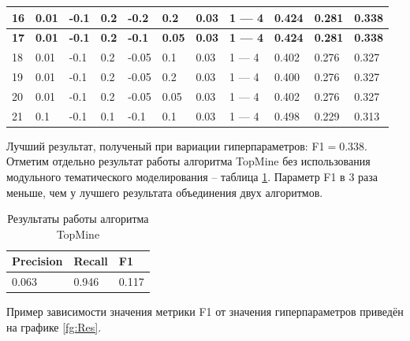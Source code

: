 \documentclass[a4paper, 12pt]{article}
\begin{document}
\begin{table}[!ht]
\begin{tabular}{|l|l|l|l|l|l|l|p{50 pt}|l|l|l|}
        \textbf{16} & \textbf{0.01} & \textbf{-0.1} & \textbf{0.2} & \textbf{-0.2} & \textbf{0.2} & \textbf{0.03} & \textbf{1 — 4} & \textbf{0.424} & \textbf{0.281} & \textbf{0.338} \\ \hline
        \textbf{17} & \textbf{0.01} & \textbf{-0.1} & \textbf{0.2} & \textbf{-0.1} & \textbf{0.05} & \textbf{0.03} & \textbf{1 — 4} & \textbf{0.424} & \textbf{0.281} & \textbf{0.338} \\ \hline
        18 & 0.01 & -0.1 & 0.2 & -0.05 & 0.1 & 0.03 & 1 — 4 & 0.402 & 0.276 & 0.327 \\ \hline
        19 & 0.01 & -0.1 & 0.2 & -0.05 & 0.2 & 0.03 & 1 — 4 & 0.400 & 0.276 & 0.327 \\ \hline
        20 & 0.01 & -0.1 & 0.2 & -0.05 & 0.05 & 0.03 & 1 — 4 & 0.402 & 0.276 & 0.327 \\ \hline
        21 & 0.1 & -0.1 & 0.1 & -0.1 & 0.1 & 0.03 & 1 — 4 & 0.498 & 0.229 & 0.313 \\
        \hline
    \end{tabular}
\end{table}

    Лучший результат, полученый при вариации гиперпараметров: F1$= 0.338$. Отметим отдельно результат работы алгоритма TopMine без использования модульного тематического моделирования -- таблица \ref{table:TopMine}. Параметр F1 в 3 раза меньше, чем у лучшего результата объединения двух алгоритмов.

    \begin{table}[!ht]
    \caption{Результаты работы алгоритма TopMine}
    \label{table:TopMine}
    \centering\medskip
    \begin{tabular}{|l|l|l|}
    \hline
        Precision & Recall & F1 \\ \hline
        0.063 & 0.946 & 0.117 \\
        \hline
    \end{tabular}
\end{table}

    Пример зависимости значения метрики F1 от значения гиперпараметров приведён на графике \ref{fg:Res}.
\end{document}
